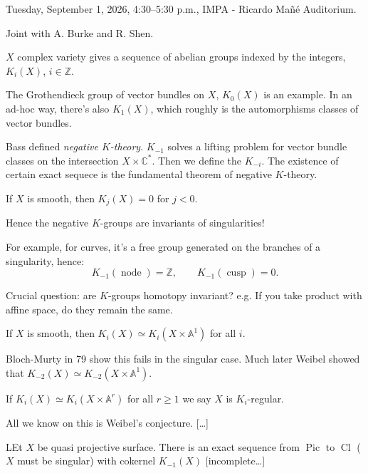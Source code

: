 Tuesday, September 1, 2026,
4:30--5:30 p.m.,
IMPA - Ricardo Ma\~n\'e Auditorium.

\medskip\noindent
Joint with A. Burke and R. Shen.

\medskip\noindent
$X$ complex variety gives a sequence
of abelian groups indexed by the integers,
$K_i(X)$, $i \in \mathbb{Z}$.

The Grothendieck group of vector bundles on
$X$, $K_0(X)$ is an example. In an ad-hoc
way, there's also $K_1(X)$, which roughly
is the automorphisms classes of vector
bundles.

Bass defined {\it negative $K$-theory}.
$K_{-1}$ solves a lifting problem
for vector bundle classes on the
intersection
$X \times \mathbb{C}^*$. Then we define
the $K_{-i}$. The existence of certain exact
sequece is the fundamental theorem
of negative $K$-theory.

\begin{theorem}[Grothendieck]
\label{theorem-grothendieck-k}
If $X$ is smooth, then $K_j(X) =0 $ for
$j<0$.
\end{theorem}

\noindent
Hence the negative $K$-groups are invariants
of singularities!

For example, for curves, it's a free group
generated on the branches of a singularity,
hence:
$$
K_{-1}(\operatorname{node})= \mathbb{Z},
\qquad 
K_{-1}(\operatorname{cusp}) = 0.
$$

Crucial question: are $K$-groups
homotopy invariant? e.g. If you take
product with affine space, do they remain
the same.

\begin{theorem}[Quillen]
\label{theorem-quillen-k}
If $X$ is smooth, then $K_i(X) \simeq K_i(X
\times \mathbb{A}^1)$ for all $i$.
\end{theorem}

\noindent
Bloch-Murty in 79 show this fails in the
singular case. Much later Weibel showed that
$K_{-2}(X) \simeq K_{-2}(X \times
\mathbb{A}^1)$.

\medskip\noindent
If $K_i(X) \simeq K_i(X \times \mathbb{A}^r)$
for all $r \geq  1$ we say $X$ is
$K_i$-regular.

All we know on this is Weibel's conjecture.
[…]

\begin{theorem}[Weibel, 01]
\label{theorem-weibel01}
LEt $X$ be quasi projective surface. There is an
exact sequence from $\operatorname{Pic}$ to
$\operatorname{Cl}$ ($X$ must be singular)
with cokernel $K_{-1}(X)$ [incomplete…]
\end{theorem}

